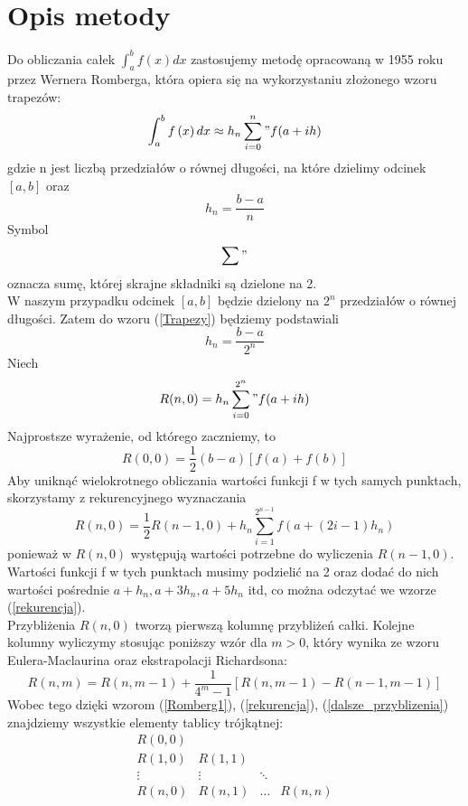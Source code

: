 \documentclass[12pt]{article}
\begin{document}
\section{Opis metody}
Do obliczania ca\l{}ek $\int_{a}^{b}f\left( x\right)dx$ zastosujemy metod\k{e} opracowan\k{a} w 1955 roku przez Wernera Romberga, kt\'ora opiera si\k{e} na wykorzystaniu z\l{}o\.zonego wzoru trapez\'ow:
\begin{equation}
\int_{a}^{b}f\left( x\right)dx \approx h_n \sum_{i=0}^n " f(a+ih) \label{Trapezy}
\end{equation}
gdzie n jest liczb\k{a} przedzia\l{}\'ow o r\'ownej d\l{}ugo\'sci, na kt\'ore dzielimy odcinek $[a,b]$ oraz
\[
h_n=\frac{b-a}{n}
\]
Symbol
\[
\sum "
\]
oznacza sum\k{e}, kt\'orej skrajne sk\l{}adniki s\k{a} dzielone na 2. 
\\
W naszym przypadku odcinek $[a,b]$ b\k{e}dzie dzielony na $2^{n}$ przedzia\l{}\'ow o r\'ownej d\l{}ugo\'sci. Zatem do wzoru (\ref{Trapezy}) b\k{e}dziemy podstawiali
\[
h_n=\frac{b-a}{2^n}
\]
Niech 
\begin{equation}
R(n,0)=h_n \sum_{i=0}^{2^n} " f(a+ih) \label{Romberg1}
\end{equation}
Najprostsze wyra\.zenie, od kt\'orego zaczniemy, to 
\[
R(0,0)=\frac{1}{2}(b-a)[f(a)+f(b)]
\]
Aby unikn\k{a}\'c wielokrotnego obliczania warto\'sci funkcji f w tych samych punktach, skorzystamy z rekurencyjnego wyznaczania
\begin{equation}
R(n,0)=\frac{1}{2}R(n-1,0)+h_n \sum_{i=1}^{2^{n-1}} f(a+(2i-1)h_n) \label{rekurencja}
\end{equation}
poniewa\.z w $R(n,0)$ wyst\k{e}puj\k{a} warto\'sci potrzebne do wyliczenia $R(n-1,0)$. Warto\'sci funkcji f w tych punktach musimy podzieli\'c na 2 oraz doda\'c do nich warto\'sci po\'srednie $a+h_n , a+3h_n, a+5h_n$ itd, co mo\.zna odczyta\'c we wzorze (\ref{rekurencja}). 
\\
Przybli\.zenia $R(n,0)$ tworz\k{a} pierwsz\k{a} kolumn\k{e} przybli\.ze\'n ca\l{}ki. Kolejne kolumny wyliczymy stosuj\k{a}c poni\.zszy wz\'or dla $m>0$, kt\'ory wynika ze wzoru Eulera-Maclaurina oraz ekstrapolacji Richardsona:
\begin{equation}
R(n,m)=R(n,m-1)+\frac{1}{4^m-1}[R(n,m-1)-R(n-1,m-1)] \label{dalsze_przyblizenia}
\end{equation}
Wobec tego dzi\k{e}ki wzorom (\ref{Romberg1}), (\ref{rekurencja}), (\ref{dalsze_przyblizenia}) znajdziemy wszystkie elementy tablicy tr\'ojk\k{a}tnej:
$$
\begin{array}{cccc}
R(0,0)\\
R(1,0) & R(1,1) \\
\vdots & \vdots & \ddots \\
R(n,0) & R(n,1) & \dots & R(n,n) 
\end{array}
$$
\end{document}
